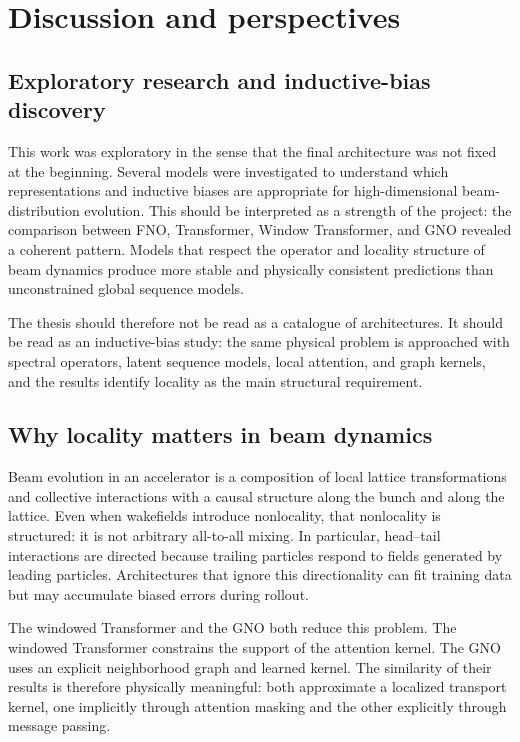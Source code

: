 \documentclass[11pt,a4paper]{article}
\begin{document}
\begin{sloppypar}
\section{Discussion and perspectives}
\label{sec:discussion}

\subsection{Exploratory research and inductive-bias discovery}
This work was exploratory in the sense that the final architecture was not fixed at the beginning. Several models were investigated to understand which representations and inductive biases are appropriate for high-dimensional beam-distribution evolution. This should be interpreted as a strength of the project: the comparison between FNO, Transformer, Window Transformer, and GNO revealed a coherent pattern. Models that respect the operator and locality structure of beam dynamics produce more stable and physically consistent predictions than unconstrained global sequence models.

The thesis should therefore not be read as a catalogue of architectures. It should be read as an inductive-bias study: the same physical problem is approached with spectral operators, latent sequence models, local attention, and graph kernels, and the results identify locality as the main structural requirement.

\subsection{Why locality matters in beam dynamics}
Beam evolution in an accelerator is a composition of local lattice transformations and collective interactions with a causal structure along the bunch and along the lattice. Even when wakefields introduce nonlocality, that nonlocality is structured: it is not arbitrary all-to-all mixing. In particular, head--tail interactions are directed because trailing particles respond to fields generated by leading particles. Architectures that ignore this directionality can fit training data but may accumulate biased errors during rollout.

The windowed Transformer and the GNO both reduce this problem. The windowed Transformer constrains the support of the attention kernel. The GNO uses an explicit neighborhood graph and learned kernel. The similarity of their results is therefore physically meaningful: both approximate a localized transport kernel, one implicitly through attention masking and the other explicitly through message passing.


\end{sloppypar}
\end{document}
